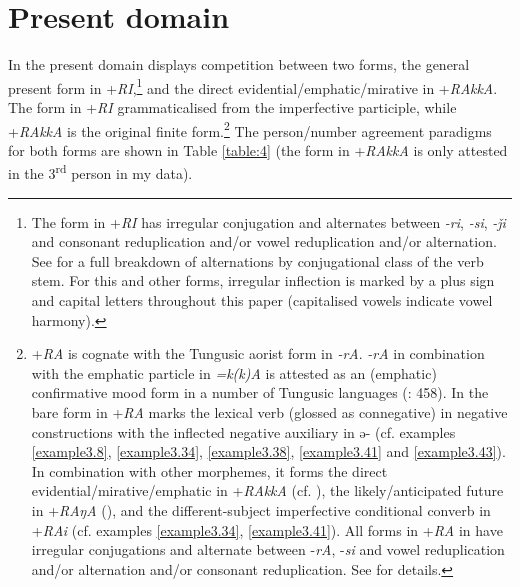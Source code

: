 \documentclass[output=paper,colorlinks,citecolor=brown]{langscibook}
\begin{document}
\section{Present domain}\label{Section3.4}

In the present domain  displays competition between two forms, the general present form in +\textit{RI},\footnote{The form in +\textit{RI} has irregular conjugation and alternates between \textit{-ri}, \textit{-si}, \textit{-ǰi} and consonant reduplication and/or vowel reduplication and/or alternation. See \citet{Ikegami_1959} for a full breakdown of alternations by conjugational class of the verb stem. For this and other forms, irregular inflection is marked by a plus sign and capital letters throughout this paper (capitalised vowels indicate vowel harmony).} and the direct evidential/emphatic/mirative in +\textit{RAkkA}. The form in +\textit{RI} grammaticalised from the imperfective participle, while +\textit{RAkkA} is the original finite form.\footnote{\label{footnote8}+\textit{RA} is cognate with the Tungusic aorist form in \textit{-rA}. \textit{-rA} in combination with the emphatic particle in \textit{=k(k)A} is attested as an (emphatic) confirmative mood form in a number of Tungusic languages (\citealt{Malchukov_2000}: 458). In  the bare form in +\textit{RA} marks the lexical verb (glossed as connegative) in negative constructions with the inflected negative auxiliary in ə- (cf. examples \ref{example3.8}, \ref{example3.34}, \ref{example3.38}, \ref{example3.41} and \ref{example3.43}). In combination with other morphemes, it forms the direct evidential/mirative/emphatic in +\textit{RAkkA} (cf. ), the likely/anticipated future in +\textit{RAŋA} (), and the different-subject imperfective conditional converb in +\textit{RAi} (cf. examples \ref{example3.34}, \ref{example3.41}). All forms in +\textit{RA} in  have irregular conjugations and alternate between -\textit{rA}, -\textit{si} and vowel reduplication and/or alternation and/or consonant reduplication. See \citet{Ikegami_1959} for details.} The person/number agreement paradigms for both forms are shown in Table \ref{table:4} (the form in +\textit{RAkkA} is only attested in the 3\textsuperscript{rd} person in my data).
\end{document}
